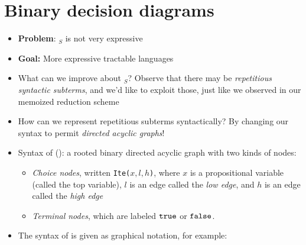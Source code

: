 \documentclass{tufte-handout}
\begin{document}
\section{Binary decision diagrams}
\begin{itemize}
  \item \textbf{Problem}: \prop$_S${} is not very expressive
  \item \textbf{Goal:} More expressive tractable languages
  \item What can we improve about \prop$_S$? Observe that there may be 
  \emph{repetitious syntactic subterms}, and we'd like to exploit those, just
  like we observed in our memoized reduction scheme
  \item How can we represent repetitious subterms syntactically? By changing our 
  syntax to permit \emph{directed acyclic graphs}!
  \item Syntax of  (\bdd{}): a rooted binary directed acyclic graph 
  with two kinds of nodes:
  \begin{itemize}
    \item \emph{Choice nodes}, written \texttt{Ite($x, l, h$)}, where $x$ is a
    propositional variable (called the top variable), $l$ is an edge called the \emph{low edge}, and 
    $h$ is an edge called the \emph{high edge}
    \item \emph{Terminal nodes}, which are labeled $\texttt{true}$ or $\texttt{false}$.
  \end{itemize}
  \item The syntax of \bdd{} is given as graphical notation, for example:

\end{itemize}
\end{document}
